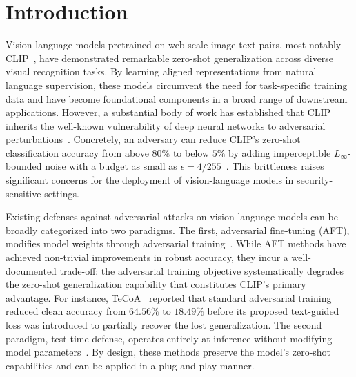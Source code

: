 \documentclass[12pt,a4paper]{article}
\begin{document}
\section{Introduction}\label{sec:intro}

Vision-language models pretrained on web-scale image-text pairs, most notably CLIP~\cite{radford2021clip}, have demonstrated remarkable zero-shot generalization across diverse visual recognition tasks. By learning aligned representations from natural language supervision, these models circumvent the need for task-specific training data and have become foundational components in a broad range of downstream applications. However, a substantial body of work has established that CLIP inherits the well-known vulnerability of deep neural networks to adversarial perturbations~\cite{goodfellow2015explaining,madry2018towards,croce2020reliable}. Concretely, an adversary can reduce CLIP's zero-shot classification accuracy from above $80\%$ to below $5\%$ by adding imperceptible $L_\infty$-bounded noise with a budget as small as $\epsilon = 4/255$~\cite{mao2023understanding}. This brittleness raises significant concerns for the deployment of vision-language models in security-sensitive settings.

Existing defenses against adversarial attacks on vision-language models can be broadly categorized into two paradigms. The first, adversarial fine-tuning (AFT), modifies model weights through adversarial training~\cite{mao2023understanding,schlarmann2024robust,xu2024pretrained,chen2025advclip}. While AFT methods have achieved non-trivial improvements in robust accuracy, they incur a well-documented trade-off: the adversarial training objective systematically degrades the zero-shot generalization capability that constitutes CLIP's primary advantage. For instance, TeCoA~\cite{mao2023understanding} reported that standard adversarial training reduced clean accuracy from $64.56\%$ to $18.49\%$ before its proposed text-guided loss was introduced to partially recover the lost generalization. The second paradigm, test-time defense, operates entirely at inference without modifying model parameters~\cite{xing2025clip,jiang2026diversifying,liu2026directional,nie2025contrastive,li2026agc}. By design, these methods preserve the model's zero-shot capabilities and can be applied in a plug-and-play manner.
\end{document}
